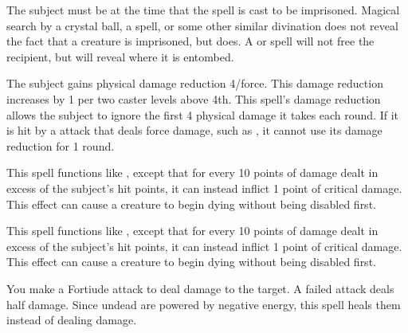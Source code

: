 The subject must be \bloodied at the time that the spell is cast to be imprisoned. Magical search by a crystal ball, a  spell, or some other similar divination does not reveal the fact that a creature is imprisoned, but  does. A  or  spell will not free the recipient, but will reveal where it is entombed.

\spelldur{\durshort}
\spelleffect The subject gains physical damage reduction 4/force. This damage reduction increases by 1 per two caster levels above 4th.
\spellnotes This spell's damage reduction allows the subject to ignore the first 4 physical damage it takes each round. If it is hit by a attack that deals force damage, such as , it cannot use its damage reduction for 1 round.

\spelleffect This spell functions like , except that for every 10 points of damage dealt in excess of the subject's hit points, it can instead inflict 1 point of critical damage.
\spellnotes This effect can cause a creature to begin dying without being disabled first.

\spelleffect This spell functions like , except that for every 10 points of damage dealt in excess of the subject's hit points, it can instead inflict 1 point of critical damage.
\spellnotes This effect can cause a creature to begin dying without being disabled first.

\spelleffect You make a Fortiude attack to deal damage to the target. A failed attack deals half damage. Since undead are powered by negative energy, this spell heals them instead of dealing damage.

